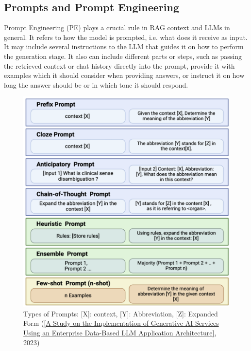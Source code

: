 \subsection{Prompts and Prompt Engineering}
Prompt Engineering (PE) plays a crucial rule in RAG context and LLMs in general. It refers to how the model is prompted, i.e. what does it receive as input. It may include several instructions to the LLM that guides it on how to perform the generation stage. It also can include different parts or steps, such as passing the retrieved context or chat history directly into the prompt, provide it with examples which it should consider when providing answers, or instruct it on how long the answer should be or in which tone it should respond.
\begin{figure}[htbp]
    \centering
    \includegraphics[width=\linewidth]{./figures/prompt-types.png}
    \caption{Types of Prompts: [X]: context, [Y]: Abbreviation, [Z]: Expanded Form
    (\href{https://www.oajaiml.com/uploads/archivepdf/63501191.pdf}{[A Study on the Implementation of Generative AI Services Using an Enterprise Data-Based LLM Application Architecture]}, 2023)}
\end{figure}